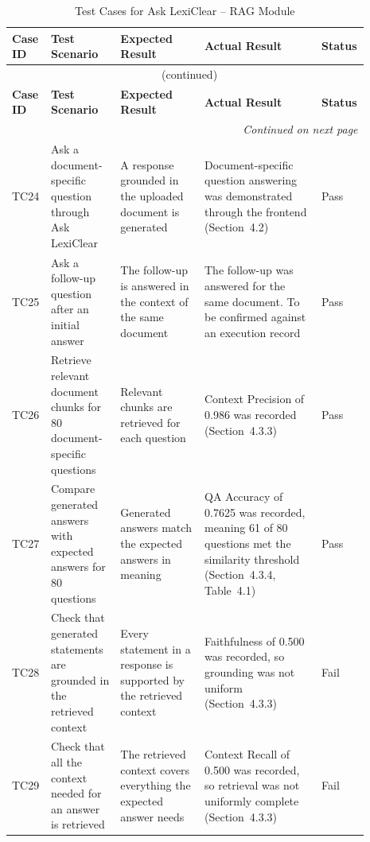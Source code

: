 \documentclass[12pt,a4paper,oneside]{report}
\begin{document}
{\footnotesize
\setlength{\tabcolsep}{3pt}
\renewcommand{\arraystretch}{1.15}
\begin{longtable}{|p{0.075\linewidth}|p{0.19\linewidth}|p{0.23\linewidth}|p{0.32\linewidth}|p{0.08\linewidth}|}
\caption{Test Cases for Ask LexiClear -- RAG Module}\label{tab:rag}\\
\hline
\textbf{Case ID} & \textbf{Test Scenario} & \textbf{Expected Result} & \textbf{Actual Result} & \textbf{Status}\\
\hline
\endfirsthead
\multicolumn{5}{c}{\tablename~\thetable{} (continued)}\\
\hline
\textbf{Case ID} & \textbf{Test Scenario} & \textbf{Expected Result} & \textbf{Actual Result} & \textbf{Status}\\
\hline
\endhead
\hline
\multicolumn{5}{r}{\emph{Continued on next page}}\\
\endfoot
\hline
\endlastfoot
TC24 & Ask a document-specific question through Ask LexiClear & A response grounded in the uploaded document is generated & Document-specific question answering was demonstrated through the frontend (Section~4.2) & Pass\\
\hline
TC25 & Ask a follow-up question after an initial answer & The follow-up is answered in the context of the same document & The follow-up was answered for the same document. To be confirmed against an execution record & Pass\\
\hline
TC26 & Retrieve relevant document chunks for 80 document-specific questions & Relevant chunks are retrieved for each question & Context Precision of 0.986 was recorded (Section~4.3.3) & Pass\\
\hline
TC27 & Compare generated answers with expected answers for 80 questions & Generated answers match the expected answers in meaning & QA Accuracy of 0.7625 was recorded, meaning 61 of 80 questions met the similarity threshold (Section~4.3.4, Table~4.1) & Pass\\
\hline
TC28 & Check that generated statements are grounded in the retrieved context & Every statement in a response is supported by the retrieved context & Faithfulness of 0.500 was recorded, so grounding was not uniform (Section~4.3.3) & Fail\\
\hline
TC29 & Check that all the context needed for an answer is retrieved & The retrieved context covers everything the expected answer needs & Context Recall of 0.500 was recorded, so retrieval was not uniformly complete (Section~4.3.3) & Fail\\
\end{longtable}
}
\end{document}
